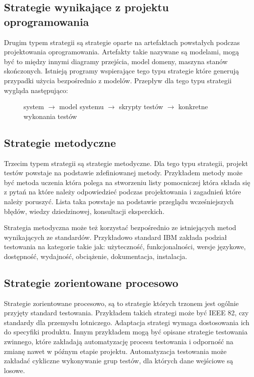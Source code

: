 \subsection{Strategie wynikające z projektu oprogramowania}
Drugim typem strategii są strategie oparte na artefaktach powstałych podczas projektowania oprogramowania. Artefakty takie nazywane są modelami, mogą być to między innymi diagramy przejścia, model domeny, maszyna stanów skończonych. Istnieją programy wspierające tego typu strategie które generują przypadki użycia bezpośrednio z modelów. Przepływ dla tego typu strategii wygląda następująco: 
\begin{figure}[h!]
  \begin{center}
   system $\rightarrow$  model systemu $\rightarrow$ skrypty testów  $\rightarrow$  konkretne wykonania testów 
  \end{center}
\end{figure}
     
  
\subsection{Strategie metodyczne}
Trzecim typem strategii są strategie metodyczne. Dla tego typu strategii, projekt testów powstaje na podstawie zdefiniowanej metody. Przykładem metody może być metoda uczenia która polega na stworzeniu listy pomocniczej która składa się z pytań na które należy odpowiedzieć podczas projektowania i zagadnień które należy poruszyć. Lista taka powstaje na podstawie przeglądu wcześniejszych błędów, wiedzy dziedzinowej, konsultacji eksperckich. 

Strategia metodyczna może też korzystać bezpośrednio ze istniejących metod wynikających ze standardów. Przykładowo standard IBM zakłada podział testowania na kategorie takie jak: użyteczność, funkcjonalności, wersje językowe, dostępność, wydajność, obciążenie, dokumentacja, instalacja.
\subsection{Strategie zorientowane procesowo}
Strategie zorientowane procesowo, są to strategie których trzonem jest ogólnie przyjęty standard testowania. Przykładem takich strategi może być IEEE 82, czy standardy dla przemysłu lotniczego. Adaptacja strategi wymaga dostosowania ich do specyfiki produktu. Innym przykładem mogą być opisane strategie testowania zwinnego, które zakładają automatyzację procesu testowania i odporność na zmianę nawet w późnym etapie projektu. Automatyzacja testowania może zakładać cykliczne wykonywanie grup testów, dla których dane wejściowe są losowe.
